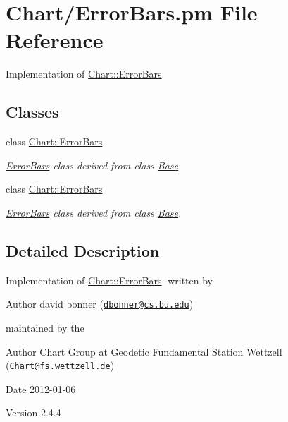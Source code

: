 \hypertarget{ErrorBars_8pm}{
\section{Chart/ErrorBars.pm File Reference}
\label{ErrorBars_8pm}
}


Implementation of \hyperlink{classChart_1_1ErrorBars}{Chart::ErrorBars}.  


\subsection*{Classes}
\begin{DoxyCompactItemize}
\item 
class \hyperlink{classChart_1_1ErrorBars}{Chart::ErrorBars}
\begin{DoxyCompactList}\small\item\em \hyperlink{classChart_1_1ErrorBars}{ErrorBars} class derived from class \hyperlink{classChart_1_1Base}{Base}. \item\end{DoxyCompactList}\item 
class \hyperlink{classChart_1_1ErrorBars}{Chart::ErrorBars}
\begin{DoxyCompactList}\small\item\em \hyperlink{classChart_1_1ErrorBars}{ErrorBars} class derived from class \hyperlink{classChart_1_1Base}{Base}. \item\end{DoxyCompactList}\end{DoxyCompactItemize}


\subsection{Detailed Description}
Implementation of \hyperlink{classChart_1_1ErrorBars}{Chart::ErrorBars}. written by \begin{DoxyAuthor}{Author}
david bonner (\href{mailto:dbonner@cs.bu.edu}{\tt dbonner@cs.bu.edu})
\end{DoxyAuthor}
maintained by the \begin{DoxyAuthor}{Author}
Chart Group at Geodetic Fundamental Station Wettzell (\href{mailto:Chart@fs.wettzell.de}{\tt Chart@fs.wettzell.de}) 
\end{DoxyAuthor}
\begin{DoxyDate}{Date}
2012-\/01-\/06 
\end{DoxyDate}
\begin{DoxyVersion}{Version}
2.4.4 
\end{DoxyVersion}
